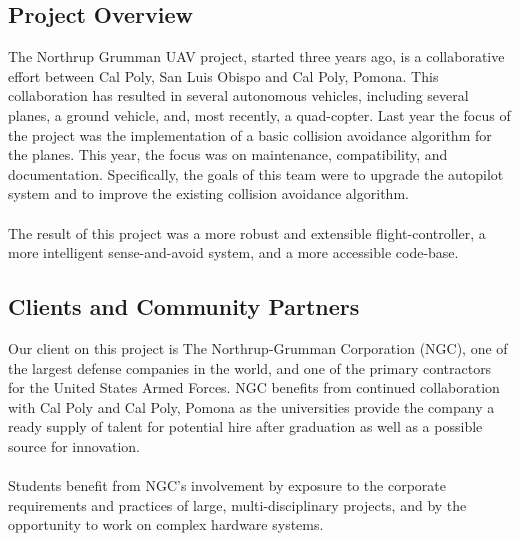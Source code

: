 \documentclass[12pt]{article}
\begin{document}
\subsection{Project Overview}
The Northrup Grumman UAV project, started three years ago, is a collaborative effort between Cal Poly, San Luis Obispo and Cal Poly, Pomona. This collaboration has resulted in several autonomous vehicles, including several planes, a ground vehicle, and, most recently, a quad-copter. Last year the focus of the project was the implementation of a basic collision avoidance algorithm for the planes. This year, the focus was on maintenance, compatibility, and documentation. Specifically, the goals of this team were to upgrade the autopilot system and to improve the existing collision avoidance algorithm.\\\\
The result of this project was a more robust and extensible flight-controller, a more intelligent sense-and-avoid system, and a more accessible code-base.

\subsection{Clients and Community Partners}
Our client on this project is The Northrup-Grumman Corporation (NGC), one of the largest defense companies in the world, and one of the primary contractors for the United States Armed Forces. NGC benefits from continued collaboration with Cal Poly and Cal Poly, Pomona as the universities provide the company a ready supply of talent for potential hire after graduation as well as a possible source for innovation.\\\\
Students benefit from NGC’s involvement by exposure to the corporate requirements and practices of large, multi-disciplinary projects, and by the opportunity to work on complex hardware systems.

\end{document}
